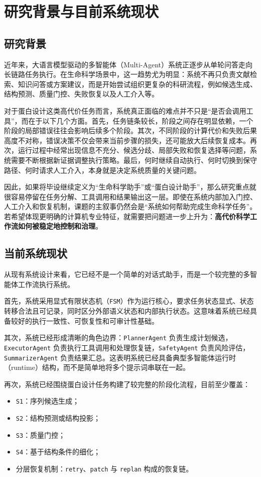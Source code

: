 \section{研究背景与目前系统现状}

\subsection{研究背景}

近年来，大语言模型驱动的多智能体（Multi-Agent）系统正逐步从单轮问答走向长链路任务执行。在生命科学场景中，这一趋势尤为明显：系统不再只负责文献检索、知识问答或方案建议，而是开始尝试组织更复杂的科研流程，例如候选生成、结构预测、质量门控、失败恢复以及人工介入等。

对于蛋白设计这类高代价任务而言，系统真正面临的难点并不只是“是否会调用工具”，而在于以下几个方面。首先，任务链条较长，阶段之间存在明显依赖，一个阶段的局部错误往往会影响后续多个阶段。其次，不同阶段的计算代价和失败后果高度不对称，错误决策不仅会带来当前步骤的损失，还可能放大后续恢复成本。再次，运行过程中经常出现信息不充分、候选分歧、局部失败和恢复选择等问题，系统需要不断根据新证据调整执行策略。最后，何时继续自动执行、何时切换到保守路径、何时请求人工介入，本身就是决定系统质量的关键问题。

因此，如果将毕设继续定义为“生命科学助手”或“蛋白设计助手”，那么研究重点就很容易停留在任务分解、工具调用和结果输出这一层。即使在系统内部加入门控、人工介入和恢复机制，课题的主叙事仍然会是“系统如何帮助完成生命科学任务”。若希望体现更明确的计算机专业特征，就需要把问题进一步上升为：\textbf{高代价科学工作流如何被稳定地控制和治理}。

\subsection{当前系统现状}

从现有系统设计来看，它已经不是一个简单的对话式助手，而是一个较完整的多智能体工作流执行系统。

首先，系统采用显式有限状态机（\texttt{FSM}）作为运行核心，要求任务状态显式、状态转移合法且可记录，同时区分外部语义状态和内部执行状态。这意味着系统已经具备较好的执行一致性、可恢复性和可审计性基础。

其次，系统已经形成清晰的角色边界：\texttt{PlannerAgent} 负责生成计划候选，\texttt{ExecutorAgent} 负责执行工具调用和处理恢复链，\texttt{SafetyAgent} 负责风险评估，\texttt{SummarizerAgent} 负责结果汇总。这表明系统已经具备典型多智能体运行时（runtime）结构，而不是简单地将多个提示词串联在一起。

再次，系统已经围绕蛋白设计任务构建了较完整的阶段化流程，目前至少覆盖：
\begin{itemize}
	\item \texttt{S1}：序列候选生成；
	\item \texttt{S2}：结构预测或结构投影；
	\item \texttt{S3}：质量门控；
	\item \texttt{S4}：基于结构条件的细化；
	\item 分层恢复机制：\texttt{retry}、\texttt{patch} 与 \texttt{replan} 构成的恢复链。
\end{itemize}

